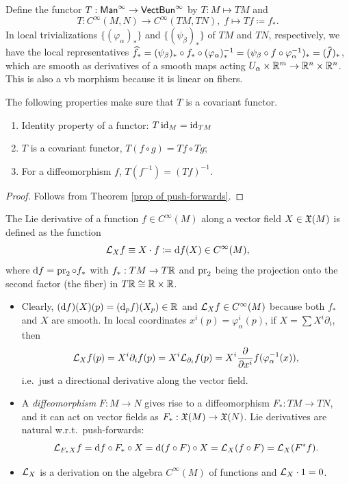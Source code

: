 \begin{defn}
Define the functor $T:\mathsf{Man}^\infty \to \mathsf{VectBun}^\infty$ by $T:M\mapsto TM$ and \[T:C^\infty(M,N)\to C^\infty(TM,TN),\; f\mapsto Tf\coloneqq f_\ast.\]
In local trivializations $\{(\varphi_\alpha)_\ast\}$ and $\{(\psi_\beta)_\ast\}$ of $TM$ and $TN$, respectively, we have the local representatives $\widehat{ f_\ast}=(\psi_\beta)_\ast\circ f_\ast \circ (\varphi_\alpha)_\ast^{-1}=(\psi_\beta\circ f\circ\varphi_\alpha^{-1})_\ast=(\wh{f})_\ast$, which are smooth as derivatives of a smooth maps acting $U_\alpha\times \mathbb{R}^m\to \mathbb{R}^{n}\times\mathbb{R}^n$. This is also a \gls{vb} morphism because it is linear on fibers.
\end{defn}

\begin{prop}
    The following properties make sure that $T$ is a covariant functor.
\begin{enumerate}
    \item Identity property of a functor: $T\operatorname{id}_M=\operatorname{id}_{TM}$
    \item $T$ is a covariant functor, $T(f\circ g)=Tf\circ Tg$;
    \item For a diffeomorphism $f$, $T(f^{-1})=(Tf)^{-1}$.
\end{enumerate}
\end{prop}
\begin{proof}
    Follows from Theorem \ref{prop of push-forwards}.
\end{proof}


\begin{defn}
The Lie derivative of a function $f\in C^\infty(M)$ along a vector field $X\in\mathfrak{X}(M)$ is defined as the function \[\mathcal{L}_X f\equiv X\cdot f\coloneqq {\mathrm{d}} f (X)\in C^\infty(M),\] where ${\mathrm{d}} f=\operatorname{pr}_2\circ f_\ast$ with $f_\ast:TM\to T\mathbb{R} $ and $\operatorname{pr}_2$ being the projection onto the second factor (the fiber) in $T\mathbb{R} \cong \mathbb{R} \times\mathbb{R} $. \label{def of Lie derivative}
\end{defn}

\begin{itemize}
    \item Clearly, $({\mathrm{d}} f)(X)(p)=({\mathrm{d}}_p f)(X_p)\in \mathbb{R} $ and $\mathcal{L}_X f\in C^\infty (M)$ because both $f_\ast$ and $X$ are smooth. In local coordinates $x^i(p)=\varphi_\alpha^i(p)$, if $X=\sum X^i \partial_i$, then 
    \[\mathcal{L}_X f(p)=X^i\partial_i f(p)=X^i\mathcal{L}_{\partial_i}f(p)=X^i \frac{\partial}{\partial x^i}f(\varphi_\alpha^{-1}(x)),\]
    i.e.\ just a directional derivative along the vector field.
    \item A \emph{diffeomorphism} $F:M\to N$ gives rise to a diffeomorphism $F_\ast:TM\to TN$, and it can act on vector fields as $F_\ast :\mathfrak{X}(M)\to \mathfrak{X}(N)$. Lie derivatives are natural w.r.t.\ push-forwards: 
    \[
    \mathcal{L}_{F_\ast X}f={\mathrm{d}} f\circ F_\ast\circ X={\mathrm{d}} (f\circ F)\circ X=\mathcal{L}_X (f\circ F)=\mathcal{L}_X (F^\ast f).
    \]
    \item $\mathcal{L}_X$ is a derivation on the algebra $C^\infty(M)$ of functions and $\mathcal{L}_X\cdot 1=0$.
\end{itemize}


